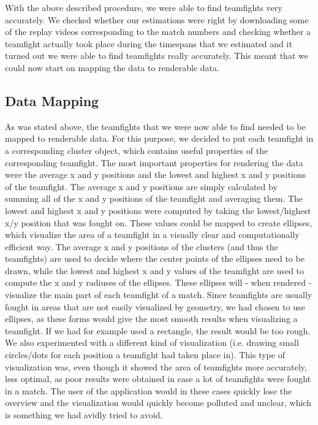 \documentclass[11pt,twoside,a4paper]{article}
\begin{document}
\newpage
With the above described procedure, we were able to find teamfights very accurately. We checked whether our estimations were right by downloading some of the replay videos corresponding to the match numbers and checking whether a teamfight actually took place during the timespans that we estimated and it turned out we were able to find teamfights really accurately. This meant that we could now start on mapping the data to renderable data.

\subsection{Data Mapping}
\label{subsec:datamapping}
As was stated above, the teamfights that we were now able to find needed to be mapped to renderable data. For this purpose, we decided to put each teamfight in a corresponding cluster object, which contains useful properties of the corresponding teamfight. The most important properties for rendering the data were the average x and y positions and the lowest and highest x and y positions of the teamfight. The average x and y positions are simply calculated by summing all of the x and y positions of the teamfight and averaging them. The lowest and highest x and y positions were computed by taking the lowest/highest x/y position that was fought on.
\newline\newline
These values could be mapped to create ellipses, which visualize the area of a teamfight in a visually clear and computationally efficient way. The average x and y positions of the clusters (and thus the teamfights) are used to decide where the center points of the ellipses need to be drawn, while the lowest and highest x and y values of the teamfight are used to compute the x and y radiuses of the ellipses. These ellipses will - when rendered - visualize the main part of each teamfight of a match.
\newline\newline
Since teamfights are usually fought in areas that are not easily visualized by geometry, we had chosen to use ellipses, as these forms would give the most smooth results when visualizing a teamfight. If we had for example used a rectangle, the result would be too rough. We also experimented with a different kind of visualization (i.e. drawing small circles/dots for each position a teamfight had taken place in). This type of visualization was, even though it showed the area of teamfights more accurately, less optimal, as poor results were obtained in case a lot of teamfights were fought in a match. The user of the application would in these cases quickly lose the overview and the visualization would quickly become polluted and unclear, which is something we had avidly tried to avoid.
\end{document}
